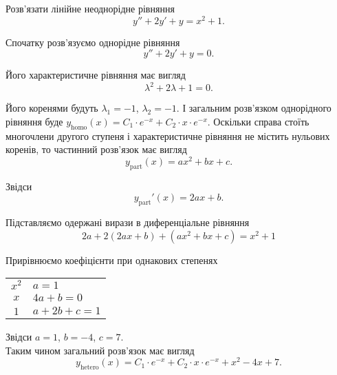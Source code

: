 \begin{example}
	Розв’язати лінійне неоднорідне рівняння \[y'' + 2 y' + y = x^2 + 1.\]
\end{example}
\begin{solution}
	Спочатку розв’язуємо однорідне рівняння
	\begin{equation*}
		y'' + 2 y' + y = 0.	
	\end{equation*}

	Його характеристичне рівняння має вигляд
	\begin{equation*}
		\lambda^2 + 2 \lambda + 1 = 0.
	\end{equation*}

	Його коренями будуть $\lambda_1 = -1$, $\lambda_2 = -1$. І загальним роз\-в'яз\-ком однорідного рівняння буде $y_{\text{homo}}(x) = C_1 \cdot e^{-x} + C_2 \cdot x \cdot e^{-x}$. Оскільки справа стоїть многочлени другого ступеня і характеристичне рівняння не містить нульових коренів, то частинний роз\-в'яз\-ок має вигляд
	\begin{equation*}
		y_{\text{part}}(x) = a x^2 + b x + c.
	\end{equation*}

	Звідси
	\begin{equation*}
		y_{\text{part}}'(x) = 2 a x + b.	
	\end{equation*}

	Підставляємо одержані вирази в диференціальне рівняння
	\begin{equation*}
		2 a + 2 (2 a x + b) + (a x^2 + b x + c) = x^2 + 1
	\end{equation*}

	Прирівнюємо коефіцієнти при однакових степенях
	\begin{table}[H]
		\centering
		\begin{tabular}{c|l}
			$x^2$ & $a = 1$ \\
			$x$ & $4 a + b = 0$ \\
			$1$ & $a + 2 b + c = 1$
		\end{tabular}
	\end{table}

	Звідси $a = 1$, $b = - 4$, $c = 7$. \\

	Таким чином загальний розв’язок має вигляд
	\begin{equation*}
		y_{\text{hetero}}(x) = C_1 \cdot e^{-x} + C_2 \cdot x \cdot e^{-x} + x^2 - 4 x + 7.
	\end{equation*}
\end{solution}

